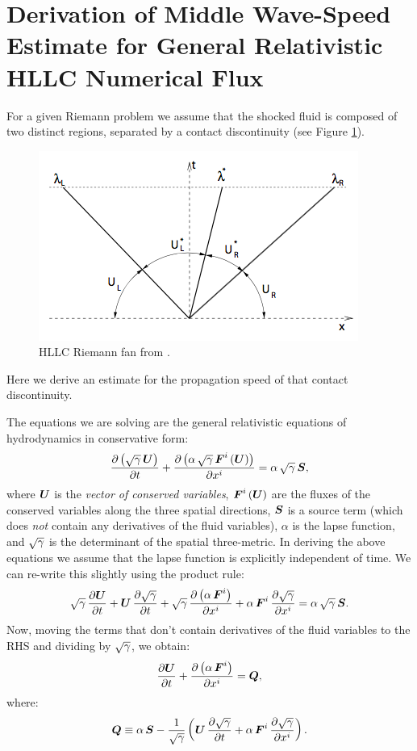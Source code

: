 \documentclass[10pt,preprint]{../aastex}
\newcommand{\figref}[1]{Figure \ref{#1}}
\begin{document}
\section{Derivation of Middle Wave-Speed Estimate for General Relativistic HLLC Numerical Flux}
For a given Riemann problem we assume that the shocked fluid is composed of two distinct regions, separated by a contact discontinuity (see \figref{Fig:HLLC_RiemannFan}).
\begin{figure}[H]
\centering
\includegraphics[scale=0.5]{HLLC_RiemannFan_MB2005}
\caption{HLLC Riemann fan from \citet{Mignone2005}.}\label{Fig:HLLC_RiemannFan}
\end{figure}


Here we derive an estimate for the propagation speed of that contact discontinuity.

The equations we are solving are the general relativistic equations of hydrodynamics in conservative form:
\begin{equation}
    \frac{\partial \left(\sqrt{\gamma}\,\boldsymbol{U}\right)}{\partial t}+\frac{\partial \left(\alpha\,\sqrt{\gamma}\,\boldsymbol{F}^{i}\left(\boldsymbol{U}\right)\right)}{\partial x^{i}}=\alpha\,\sqrt{\gamma}\,\boldsymbol{S},
\end{equation}
where $\boldsymbol{U}$ is the \textit{vector of conserved variables}, $\boldsymbol{F}^{i}\left(\boldsymbol{U}\right)$ are the fluxes of the conserved variables along the three spatial directions, $\boldsymbol{S}$ is a source term (which does \textit{not} contain any derivatives of the fluid variables), $\alpha$ is the lapse function, and $\sqrt{\gamma}$ is the determinant of the spatial three-metric. In deriving the above equations we assume that the lapse function is explicitly independent of time. We can re-write this slightly using the product rule:
\begin{equation}
    \sqrt{\gamma}\,\frac{\partial \boldsymbol{U}}{\partial t}+\boldsymbol{U}\,\frac{\partial \sqrt{\gamma}}{\partial t}+\sqrt{\gamma}\,\frac{\partial \left(\alpha\,\boldsymbol{F}^{i}\right)}{\partial x^{i}}+\alpha\,\boldsymbol{F}^{i}\,\frac{\partial \sqrt{\gamma}}{\partial x^{i}}=\alpha\,\sqrt{\gamma}\,\boldsymbol{S}.
\end{equation}
Now, moving the terms that don't contain derivatives of the fluid variables to the RHS and dividing by $\sqrt{\gamma}$, we obtain:
\begin{equation}\label{Eq:EulerConsSources}
    \frac{\partial \boldsymbol{U}}{\partial t}+\frac{\partial \left(\alpha\,\boldsymbol{F}^{i}\right)}{\partial x^{i}}=\boldsymbol{Q},
\end{equation}
where:
\begin{equation}
    \boldsymbol{Q}\equiv\alpha\,\boldsymbol{S}-\frac{1}{\sqrt{\gamma}}\left(\boldsymbol{U}\,\frac{\partial \sqrt{\gamma}}{\partial t}+\alpha\,\boldsymbol{F}^{i}\,\frac{\partial \sqrt{\gamma}}{\partial x^{i}}\right).
\end{equation}
\end{document}

